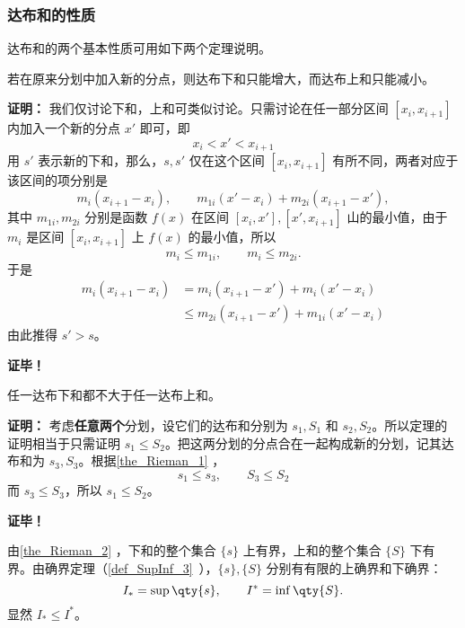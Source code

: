 \subsubsection{达布和的性质}
达布和的两个基本性质可用如下两个定理说明。
\begin{theorem}{}\label{the_Rieman_1}
若在原来分划中加入新的分点，则达布下和只能增大，而达布上和只能减小。
\end{theorem}
\textbf{证明：}
我们仅讨论下和，上和可类似讨论。只需讨论在任一部分区间 $[x_i,x_{i+1}]$ 内加入一个新的分点 $x'$ 即可，即
\begin{equation}
x_i<x'<x_{i+1}
\end{equation}
用 $s'$ 表示新的下和，那么，$s,s'$ 仅在这个区间  $[x_i,x_{i+1}]$ 有所不同，两者对应于该区间的项分别是
\begin{equation}
m_i(x_{i+1}-x_i),\qquad m_{1i}(x'-x_i)+m_{2i}(x_{i+1}-x'),
\end{equation}
其中 $m_{1i},m_{2i}$ 分别是函数 $f(x)$ 在区间 $[x_i,x'],[x',x_{i+1}]$ 山的最小值，由于 $m_i$ 是区间 $[x_i,x_{i+1}]$ 上 $f(x)$ 的最小值，所以
\begin{equation}
m_i\leq m_{1i},\qquad m_i\leq m_{2i}.
\end{equation}
于是
\begin{equation}
\begin{aligned}
m_i(x_{i+1}-x_i)&=m_i(x_{i+1}-x')+m_i(x'-x_i)\\
&\leq m_{2i}(x_{i+1}-x')+m_{1i}(x'-x_i)
\end{aligned}
\end{equation}
由此推得 $s'>s$。

\textbf{证毕！}
\begin{theorem}{}\label{the_Rieman_2}
任一达布下和都不大于任一达布上和。
\end{theorem}
\textbf{证明：}
考虑\textbf{任意两个}分划，设它们的达布和分别为 $s_1,S_1$ 和 $s_2,S_2$。所以定理的证明相当于只需证明 $s_1\leq S_2$。把这两分划的分点合在一起构成新的分划，记其达布和为 $s_3,S_3$。根据\autoref{the_Rieman_1} ，
\begin{equation}
s_1\leq s_3,\qquad S_3\leq S_2
\end{equation}
 而 $s_3\leq S_3$，所以 $s_1\leq S_2$。

\textbf{证毕！}

由\autoref{the_Rieman_2} ，下和的整个集合 $\{s\}$ 上有界，上和的整个集合 $\{S\}$ 下有界。由确界定理（\autoref{def_SupInf_3}~），$\{s\},\{S\}$ 分别有有限的上确界和下确界：
\begin{equation}
I_*=\sup\qty{s},\qquad I^*=\inf\qty{S}.
\end{equation}
显然 $I_*\leq I^*$。

